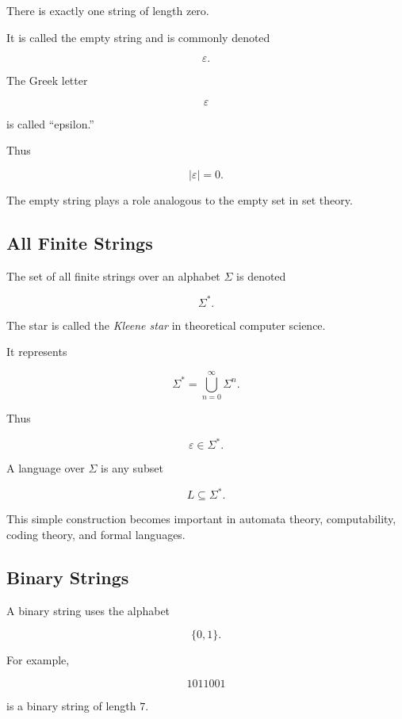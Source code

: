 There is exactly one string of length zero.

It is called the empty string and is commonly denoted

\[
\boxed{
\varepsilon.
}
\]

The Greek letter

\[
\varepsilon
\]

is called ``epsilon.''

Thus

\[
|\varepsilon|=0.
\]

The empty string plays a role analogous to the empty set in set theory.

\subsection{All Finite Strings}
\label{subsec:all-finite-strings}

The set of all finite strings over an alphabet \(\Sigma\) is denoted

\[
\boxed{
\Sigma^{*}.
}
\]

The star is called the \emph{Kleene star} in theoretical computer
science.

It represents

\[
\boxed{
\Sigma^{*}
=
\bigcup_{n=0}^{\infty}\Sigma^n.
}
\]

Thus

\[
\varepsilon\in\Sigma^{*}.
\]

A language over \(\Sigma\) is any subset

\[
L\subseteq\Sigma^{*}.
\]

This simple construction becomes important in automata theory,
computability, coding theory, and formal languages.

\subsection{Binary Strings}
\label{subsec:binary-strings}

A binary string uses the alphabet

\[
\{0,1\}.
\]

For example,

\[
1011001
\]

is a binary string of length \(7\).

